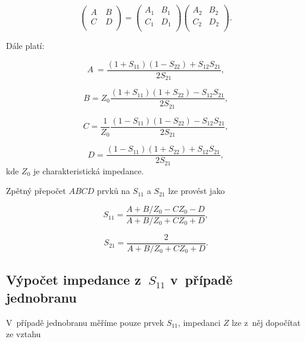 \documentclass{protokol}
\newcommand\sparam{S}
\newcommand\impedance{Z}
\begin{document}
\[
\begin{pmatrix}
	A~& B  \\
	C &	D  \\
\end{pmatrix}
=
\begin{pmatrix}
	A_1 & B_1  \\
	C_1 & D_1  \\
\end{pmatrix}
%
\begin{pmatrix}
	A_2 & B_2  \\
	C_2 & D_2  \\
\end{pmatrix}
.\]

Dále platí:

\begin{equation}
	A~= \frac{(1+S_{11})(1-S_{22})+S_{12}S_{21}}{2S_{21}},
	\label{eq:A}
\end{equation}

\begin{equation}
	B = Z_0 \frac{(1+S_{11})(1+S_{22})-S_{12}S_{21}}{2S_{21}},
	\label{eq:B}
\end{equation}

\begin{equation}
	C = \frac{1}{Z_0} \frac{(1-S_{11})(1-S_{22})-S_{12}S_{21}}{2S_{21}},
	\label{eq:C}
\end{equation}

\begin{equation}
	D = \frac{(1-S_{11})(1+S_{22})+S_{12}S_{21}}{2S_{21}},
	\label{eq:D}
\end{equation}
kde $\impedance_{0}$ je charakteristická impedance.

Zpětný přepočet $ABCD$ prvků na $S_{11}$ a $S_{21}$ lze provést jako

\begin{equation}
	S_{11} = \frac{A+B/Z_0-CZ_0-D}{A+B/Z_0+CZ_0+D},
	\label{eq:s11}
\end{equation}

\begin{equation}
	S_{21} = \frac{2}{A+B/Z_0+CZ_0+D}.
	\label{eq:s21}
\end{equation}

\subsection{Výpočet impedance z~$\sparam_{11}$ v~případě jednobranu}
V~případě jednobranu měříme pouze prvek $\sparam_{11}$, impedanci $\impedance$
lze z~něj dopočítat ze vztahu
\end{document}
